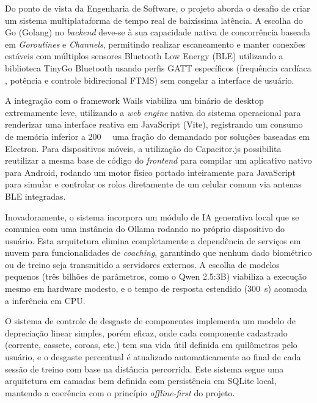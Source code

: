 \documentclass[
    a4paper,
    12pt,
    oneside,
    english,
    brazil,
    chapter=TITLE,
    section=TITLE,
]{abntex2}
\begin{document}
Do ponto de vista da Engenharia de Software, o projeto aborda o desafio de criar um sistema multiplataforma de tempo real de baixíssima latência. A escolha do Go (Golang) no \textit{backend} deve-se à sua capacidade nativa de concorrência baseada em \textit{Goroutines} e \textit{Channels}, permitindo realizar escaneamento e manter conexões estáveis com múltiplos sensores Bluetooth Low Energy (BLE) utilizando a biblioteca TinyGo Bluetooth \cite{tinygo2024} usando perfis GATT específicos (frequência cardíaca \cite{bluetooth2017}, potência e controle bidirecional FTMS) sem congelar a interface de usuário.

A integração com o framework Wails \cite{wails2024} viabiliza um binário de desktop extremamente leve, utilizando a \textit{web engine} nativa do sistema operacional para renderizar uma interface reativa em JavaScript (Vite), registrando um consumo de memória inferior a \SI{200}{\mega\byte} uma fração do demandado por soluções baseadas em Electron. Para dispositivos móveis, a utilização do Capacitor.js \cite{capacitor2024} possibilita reutilizar a mesma base de código do \textit{frontend} para compilar um aplicativo nativo para Android, rodando um motor físico portado inteiramente para JavaScript para simular e controlar os rolos diretamente de um celular comum via antenas BLE integradas.

Inovadoramente, o sistema incorpora um módulo de IA generativa local que se comunica com uma instância do Ollama \cite{ollama2024} rodando no próprio dispositivo do usuário. Esta arquitetura elimina completamente a dependência de serviços em nuvem para funcionalidades de \textit{coaching}, garantindo que nenhum dado biométrico ou de treino seja transmitido a servidores externos. A escolha de modelos pequenos (três bilhões de parâmetros, como o Qwen 2.5:3B) viabiliza a execução mesmo em hardware modesto, e o tempo de resposta estendido (\SI{300}{\second}) acomoda a inferência em CPU.

O sistema de controle de desgaste de componentes implementa um modelo de depreciação linear simples, porém eficaz, onde cada componente cadastrado (corrente, cassete, coroas, etc.) tem sua vida útil definida em quilômetros pelo usuário, e o desgaste percentual é atualizado automaticamente ao final de cada sessão de treino com base na distância percorrida. Este sistema segue uma arquitetura em camadas bem definida com persistência em SQLite \cite{sqlite2024} local, mantendo a coerência com o princípio \textit{offline-first} do projeto.
\end{document}
